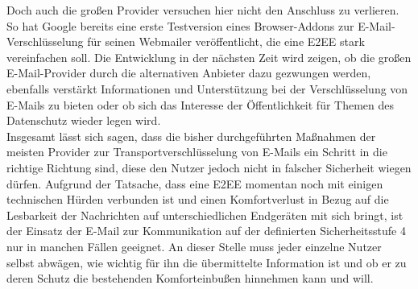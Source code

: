 \documentclass  [paper=a4,
				fontsize=12pt,
				listof=totoc,
				bibliography=totoc
				]{scrreprt}
\begin{document}
		Doch auch die großen Provider versuchen hier nicht den Anschluss zu verlieren.
		So hat Google bereits eine erste Testversion eines Browser-Addons zur E-Mail-Verschlüsselung für seinen Webmailer veröffentlicht, die eine \ac{E2EE} stark vereinfachen soll.		
		Die Entwicklung in der nächsten Zeit wird zeigen, ob die großen E-Mail-Provider durch die alternativen Anbieter dazu gezwungen werden, ebenfalls verstärkt Informationen und Unterstützung bei der Verschlüsselung von E-Mails zu bieten oder ob sich das Interesse der Öffentlichkeit für Themen des Datenschutz wieder legen wird.\medskip\\
		
		Insgesamt lässt sich sagen, dass die bisher durchgeführten Maßnahmen der meisten Provider zur Transportverschlüsselung von E-Mails ein Schritt in die richtige Richtung sind, diese den Nutzer jedoch nicht in falscher Sicherheit wiegen dürfen.
		Aufgrund der Tatsache, dass eine \ac{E2EE} momentan noch mit einigen technischen Hürden verbunden ist und einen Komfortverlust in Bezug auf die Lesbarkeit der Nachrichten auf unterschiedlichen Endgeräten mit sich bringt, ist der Einsatz der E-Mail zur Kommunikation auf der definierten Sicherheitsstufe 4 nur in manchen Fällen geeignet.
		An dieser Stelle muss jeder einzelne Nutzer selbst abwägen, wie wichtig für ihn die übermittelte Information ist und ob er zu deren Schutz die bestehenden Komforteinbußen hinnehmen kann und will.
	
%		
%				
%				
%				
%				
%									
\end{document}
